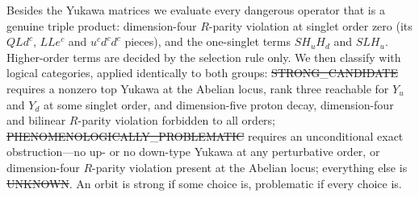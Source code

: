 Besides the Yukawa matrices we evaluate every dangerous operator that is a
genuine triple product: dimension-four $R$-parity violation at singlet order
zero (its $QLd^c$, $LLe^c$ and $u^cd^cd^c$ pieces), and the one-singlet terms
$SH_uH_d$ and $SLH_u$. Higher-order terms are decided by the selection rule only.
We then classify with logical categories, applied identically to both groups:
\st{STRONG\_CANDIDATE} requires a nonzero top Yukawa at the Abelian locus,
rank three reachable for $Y_u$ and $Y_d$ at some singlet order, and
dimension-five proton decay, dimension-four and bilinear $R$-parity violation
forbidden to all orders; \st{PHENOMENOLOGICALLY\_PROBLEMATIC} requires an
unconditional exact obstruction---no up- or no down-type Yukawa at any
perturbative order, or dimension-four $R$-parity violation present at the
Abelian locus; everything else is \st{UNKNOWN}. An orbit is strong if some
choice is, problematic if every choice is.

